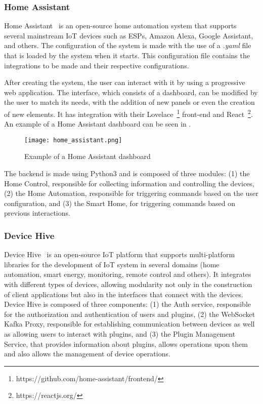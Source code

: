 \subsubsection{Home Assistant}\label{sec:home_assistant}

Home Assistant~\cite{home_assistant} is an open-source home automation system that supports several mainstream IoT devices such as ESPs, Amazon Alexa, Google Assistant, and others. The configuration of the system is made with the use of a \textit{.yaml} file that is loaded by the system when it starts. This configuration file contains the integrations to be made and their respective configurations.

After creating the system, the user can interact with it by using a progressive web application. The interface, which consists of a dashboard, can be modified by the user to match its needs, with the addition of new panels or even the creation of new elements. It has integration with their Lovelace~\footnote{https://github.com/home-assistant/frontend/} front-end and React~\footnote{https://reactjs.org/}. An example of a Home Assistant dashboard can be seen in . 

\begin{figure}[h]
\centering
\texttt{[image: home\_assistant.png]}
\caption[Example of a Home Assistant dashboard]{Example of a Home Assistant dashboard~\cite{homeassistant_image}}
\label{fig:home_assistant}
\end{figure}

The backend is made using Python3 and is composed of three modules: (1) the Home Control, responsible for collecting information and controlling the devices, (2) the Home Automation, responsible for triggering commands based on the user configuration, and (3) the Smart Home, for triggering commands based on previous interactions.

\subsubsection{Device Hive}\label{sec:device_hive}

Device Hive~\cite{device_hive} is an open-source IoT platform that supports multi-platform libraries for the development of IoT system in several domains (\eg home automation, smart energy, monitoring, remote control and others). It integrates with different types of devices, allowing modularity not only in the construction of client applications but also in the interfaces that connect with the devices. Device Hive is composed of three components: (1) the Auth service, responsible for the authorization and authentication of users and plugins, (2) the WebSocket Kafka Proxy, responsible for establishing communication between devices as well as allowing users to interact with plugins, and (3) the Plugin Management Service, that provides information about plugins, allows operations upon them and also allows the management of device operations.

